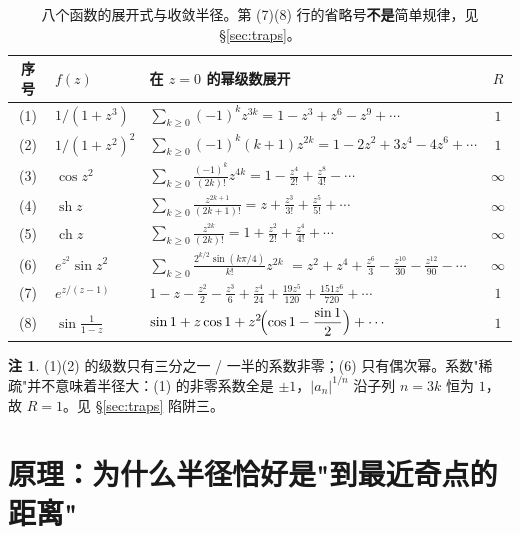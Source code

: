 \documentclass[11pt,a4paper]{ctexart}
\theoremstyle{definition}
\newtheorem{remark}[theorem]{注}
\providecommand{\sh}{\operatorname{sh}}
\providecommand{\ch}{\operatorname{ch}}
\begin{document}
\begin{table}[H]
\centering
\small
\setlength{\tabcolsep}{5pt}
\renewcommand{\arraystretch}{1.35}
\begin{tabular}{@{}c >{\raggedright\arraybackslash}p{2.9cm} >{\raggedright\arraybackslash}p{9.3cm} c@{}}
\toprule
\textbf{序号} & $f(z)$ & \textbf{在 $z=0$ 的幂级数展开} & \boldmath$R$\\
\midrule
(1) & $1/(1+z^3)$ & $\displaystyle\sum_{k\ge0}(-1)^k z^{3k}=1-z^3+z^6-z^9+\cdots$ & $1$\\
(2) & $1/(1+z^2)^2$ & $\displaystyle\sum_{k\ge0}(-1)^k(k+1)z^{2k}=1-2z^2+3z^4-4z^6+\cdots$ & $1$\\
(3) & $\cos z^2$ & $\displaystyle\sum_{k\ge0}\frac{(-1)^k}{(2k)!}z^{4k}=1-\frac{z^4}{2!}+\frac{z^8}{4!}-\cdots$ & $\infty$\\
(4) & $\sh z$ & $\displaystyle\sum_{k\ge0}\frac{z^{2k+1}}{(2k+1)!}=z+\frac{z^3}{3!}+\frac{z^5}{5!}+\cdots$ & $\infty$\\
(5) & $\ch z$ & $\displaystyle\sum_{k\ge0}\frac{z^{2k}}{(2k)!}=1+\frac{z^2}{2!}+\frac{z^4}{4!}+\cdots$ & $\infty$\\
(6) & $e^{z^2}\sin z^2$ & $\displaystyle\sum_{k\ge0}\frac{2^{k/2}\sin(k\pi/4)}{k!}z^{2k}$ \newline
   $\displaystyle{}=z^2+z^4+\frac{z^6}{3}-\frac{z^{10}}{30}-\frac{z^{12}}{90}-\cdots$ & $\infty$\\[0.4ex]
(7) & $e^{z/(z-1)}$ & $\displaystyle 1-z-\frac{z^2}{2}-\frac{z^3}{6}+\frac{z^4}{24}+\frac{19z^5}{120}+\frac{151z^6}{720}+\cdots$ & $1$\\
(8) & $\sin\frac{1}{1-z}$ & $\displaystyle \sin1+z\cos1+z^2\!\Bigl(\cos1-\frac{\sin1}{2}\Bigr)+\cdots$ & $1$\\
\bottomrule
\end{tabular}
\caption{八个函数的展开式与收敛半径。第 (7)(8) 行的省略号\textbf{不是}简单规律，见 \S\ref{sec:traps}。}
\label{tab:answers}
\end{table}

\begin{remark}
(1)(2) 的级数只有三分之一 / 一半的系数非零；(6) 只有偶次幂。系数"稀疏"并不意味着半径大：(1) 的非零系数全是 $\pm1$，$|a_n|^{1/n}$ 沿子列 $n=3k$ 恒为 $1$，故 $R=1$。见 \S\ref{sec:traps} 陷阱三。
\end{remark}

\section{原理：为什么半径恰好是"到最近奇点的距离"}
\end{document}
